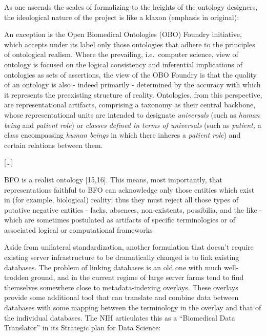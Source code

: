\documentclass[10pt]{article}
\begin{document}
\begin{multicols}{2}
As one ascends the scales of formalizing to the heights of the ontology
designers, the ideological nature of the project is like a klaxon
(emphasis in original):

\begin{leftbar}
An exception is the Open Biomedical Ontologies (OBO) Foundry initiative,
which accepts under its label only those ontologies that adhere to the
principles of ontological realism. Where the prevailing, i.e.~computer
science, view of ontology is focused on the logical consistency and
inferential implications of ontologies as sets of assertions, the view
of the OBO Foundry is that the quality of an ontology is also - indeed
primarily - determined by the accuracy with which it represents the
preexisting structure of reality. Ontologies, from this perspective, are
representational artifacts, comprising a taxonomy as their central
backbone, whose representational units are intended to designate
\emph{universals} (such as \emph{human being} and \emph{patient role})
or \emph{classes defined in terms of universals} (such as
\emph{patient,} a class encompassing \emph{human beings} in which there
inheres a \emph{patient role}) and certain relations between them.

{[}\ldots{]}

BFO is a realist ontology {[}15,16{]}. This means, most importantly,
that representations faithful to BFO can acknowledge only those entities
which exist in (for example, biological) reality; thus they must reject
all those types of putative negative entities - lacks, absences,
non-existents, possibilia, and the like - which are sometimes postulated
as artifacts of specific terminologies or of associated logical or
computational frameworks \cite{ceustersFoundationsRealistOntology2010} 
\end{leftbar}

Aside from unilateral standardization, another formulation that doesn't
require existing server infrastructure to be dramatically changed is to
link existing databases. The problem of linking databases is an old one
with much well-trodden ground, and in the current regime of large server
farms tend to find themselves somewhere close to metadata-indexing
overlays. These overlays provide some additional tool that can translate
and combine data between databases with some mapping between the
terminology in the overlay and that of the individual databases. The NIH
articulates this as a ``Biomedical Data Translator'' in its Strategic
plan for Data Science:


\end{multicols}
\end{document}
